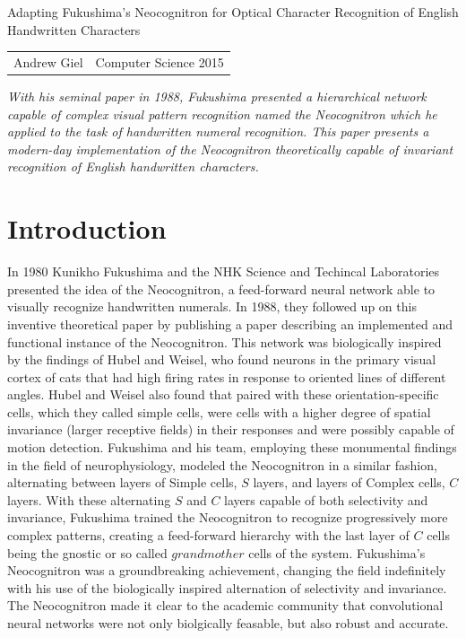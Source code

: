 \documentclass[12pt]{article}
\begin{document}
\begin{center}
{\Large Adapting Fukushima's Neocognitron for Optical Character Recognition of English Handwritten Characters}

\begin{tabular}{rl}
Andrew Giel & Computer Science 2015
\end{tabular}
\end{center}

\textit{With his seminal paper in 1988, Fukushima presented a hierarchical network capable of complex visual pattern recognition named the Neocognitron which he applied to the task of handwritten numeral recognition. This paper presents a modern-day implementation of the Neocognitron theoretically capable of invariant recognition of English handwritten characters.}

\section{Introduction}

In 1980 Kunikho Fukushima and the NHK Science and Techincal Laboratories presented the idea of the Neocognitron, a feed-forward neural network able to visually recognize handwritten numerals. In 1988, they followed up on this inventive theoretical paper by publishing a paper describing an implemented and functional instance of the Neocognitron. This network was biologically inspired by the findings of Hubel and Weisel, who found neurons in the primary visual cortex of cats that had high firing rates in response to oriented lines of different angles. Hubel and Weisel also found that paired with these orientation-specific cells, which they called simple cells, were cells with a higher degree of spatial invariance (larger receptive fields) in their responses and were possibly capable of motion detection. Fukushima and his team, employing these monumental findings in the field of neurophysiology, modeled the Neocognitron in a similar fashion, alternating between layers of Simple cells, $S$ layers, and layers of Complex cells, $C$ layers. With these alternating $S$ and $C$ layers capable of both selectivity and invariance, Fukushima trained the Neocognitron to recognize progressively more complex patterns, creating a feed-forward hierarchy with the last layer of $C$ cells being the gnostic or so called $grandmother$ cells of the system. Fukushima's Neocognitron was a groundbreaking achievement, changing the field indefinitely with his use of the biologically inspired alternation of selectivity and invariance. The Neocognitron made it clear to the academic community that convolutional neural networks were not only biolgically feasable, but also robust and accurate. 
\end{document}
